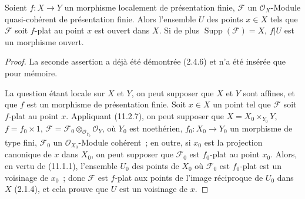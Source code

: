\begin{theorem}[11.3.1]
\label{IV.11.3.1-fr}
Soient $f:X\to Y$ un morphisme localement de présentation finie,
$\mathcal F$ un $\mathcal O_X$-Module quasi-cohérent de présentation finie.
Alors l'ensemble $U$ des points $x\in X$ tels que $\mathcal F$ soit $f$-plat
au point $x$ est ouvert dans $X$. Si de plus $\operatorname{Supp}(\mathcal F)=X$,
$f|U$ est un morphisme ouvert.
\end{theorem}

\begin{proof}
La seconde assertion a déjà été démontrée (2.4.6) et n'a été insérée que pour
mémoire.

La question étant locale sur $X$ et $Y$, on peut supposer que $X$ et $Y$ sont
affines, et que $f$ est un morphisme de présentation finie. Soit $x\in X$ un
point tel que $\mathcal F$ soit $f$-plat au point $x$. Appliquant (11.2.7), on
peut supposer que
$X=X_0\times_{Y_0}Y$, $f=f_0\times1$,
$\mathcal F=\mathcal F_0\otimes_{\mathcal O_{Y_0}}\mathcal O_Y$,
où $Y_0$ est noethérien, $f_0:X_0\to Y_0$ un morphisme de type fini,
$\mathcal F_0$ un $\mathcal O_{X_0}$-Module cohérent~; en outre, si $x_0$ est la
projection canonique de $x$ dans $X_0$, on peut supposer que $\mathcal F_0$ est
$f_0$-plat au point $x_0$. Alors, en vertu de (11.1.1), l'ensemble $U_0$ des
points de $X_0$ où $\mathcal F_0$ est $f_0$-plat est un voisinage de $x_0$~;
donc $\mathcal F$ est $f$-plat aux points de l'image réciproque de $U_0$ dans
$X$ (2.1.4), et cela prouve que $U$ est un voisinage de $x$.
\end{proof}

